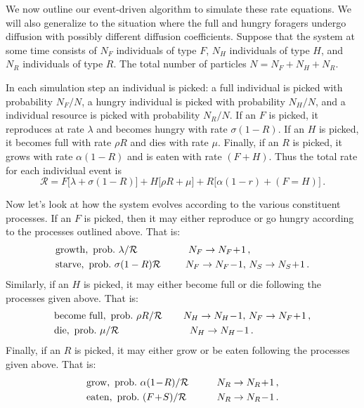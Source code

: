 \documentclass[11pt]{iopart}
\begin{document}
We now outline our event-driven algorithm to simulate these rate equations.
We will also generalize to the situation where the full and hungry foragers
undergo diffusion with possibly different diffusion coefficients.  Suppose
that the system at some time consists of $N_F$ individuals of type $F$, $N_H$
individuals of type $H$, and $N_R$ individuals of type $R$.  The total number
of particles $N=N_F+N_H+N_R$.

In each simulation step an individual is picked: a full individual is picked
with probability $N_F/N$, a hungry individual is picked with probability
$N_H/N$, and a individual resource is picked with probability $N_R/N$.  If an
$F$ is picked, it reproduces at rate $\lambda$ and becomes hungry with rate
$\sigma(1-R)$.  If an $H$ is picked, it becomes full with rate $\rho R$ and
dies with rate $\mu$.  Finally, if an $R$ is picked, it grows with rate
$\alpha(1-R)$ and is eaten with rate $(F+H)$.  Thus the total rate for each
individual event is
\begin{equation}
\mathcal{R}=F\big[\lambda +\sigma(1-R)\big]+ H\big[\rho R+\mu\big]+
R\big[\alpha(1-r)+(F=H)\big]\,.
\end{equation}

Now let's look at how the system evolves according to the various constituent
processes.  If an $F$ is picked, then it may either reproduce or go hungry
according to the processes outlined above.
That is:
\begin{align*}
&\mathrm{growth,~ prob.\ } \lambda/\mathcal{R}\hskip 0.72 in N_F\to N_F\!+\!1\,,\\
&\mathrm{starve,~ prob.\ } \sigma(1-R)\mathcal{R} \hskip 0.35 in N_F\to N_F\!-\!1,\,
  N_S\to N_S\!+\!1\,.
\end{align*}
Similarly, if an $H$ is picked, it may either become full or die following the
processes given above.  That is:
\begin{align*}
&\mathrm{become\ full,~  prob.\ } \rho R/\mathcal{R}\hskip 0.3in N_H\to N_H\!-\!1,\,
  N_F\to N_F\!+\!1\,,\\
&\mathrm{die,~ prob.\ } \mu/\mathcal{R}\hskip 1 in N_H\to N_H\!-\!1\,.
\end{align*}
Finally, if an $R$ is picked, it may either grow or be eaten following the
processes given above.  That is:
\begin{align*}
&\mathrm{grow,~ prob.\ } \alpha(1\!-\!R)/\mathcal{R}\hskip 0.4in N_R\to N_R\!+\!1\,,\\
&\mathrm{eaten,~ prob.\ } (F\!+\!S)/\mathcal{R}\hskip 0.43in  N_R\to N_R\!-\!1\,.
\end{align*}
\end{document}
